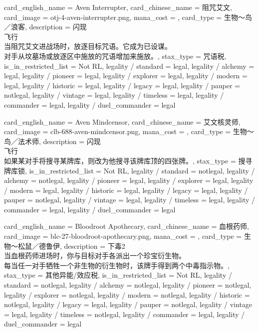 \documentclass[lang = cn, color = black, 10pt]{AllThatStax}
\begin{document}
\card
{
	card_english_name = {Aven Interrupter},
	card_chinese_name = {阻咒艾文},
	card_image = otj-4-aven-interrupter.png,
	mana_cost = ,
	card_type = 生物～鸟／浪客,
	description = {闪现\\
飞行\\
当阻咒艾文进战场时，放逐目标咒语。它成为已设谋。\\
对手从坟墓场或放逐区中施放的咒语增加来施放。},
	stax_type = 咒语税,
	is_in_restricted_list = Not RL,
	legality / standard = legal,
	legality / alchemy = legal,
	legality / pioneer = legal,
	legality / explorer = legal,
	legality / modern = legal,
	legality / historic = legal,
	legality / legacy = legal,
	legality / pauper = notlegal,
	legality / vintage = legal,
	legality / timeless = legal,
	legality / commander = legal,
	legality / duel_commander = legal
}

\card
{
	card_english_name = {Aven Mindcensor},
	card_chinese_name = {艾文核灵师},
	card_image = clb-688-aven-mindcensor.png,
	mana_cost = ,
	card_type = 生物～鸟／法术师,
	description = {闪现\\
飞行\\
如果某对手将搜寻某牌库，则改为他搜寻该牌库顶的四张牌。},
	stax_type = 搜寻牌库锁,
	is_in_restricted_list = Not RL,
	legality / standard = notlegal,
	legality / alchemy = notlegal,
	legality / pioneer = legal,
	legality / explorer = legal,
	legality / modern = legal,
	legality / historic = legal,
	legality / legacy = legal,
	legality / pauper = notlegal,
	legality / vintage = legal,
	legality / timeless = legal,
	legality / commander = legal,
	legality / duel_commander = legal
}

\card
{
	card_english_name = {Bloodroot Apothecary},
	card_chinese_name = {血根药师},
	card_image = blc-27-bloodroot-apothecary.png,
	mana_cost = ,
	card_type = 生物～松鼠／德鲁伊,
	description = {下毒2\\
当血根药师进场时，你与目标对手各派出一个珍宝衍生物。\\
每当任一对手牺牲一个非生物的衍生物时，该牌手得到两个中毒指示物。},
	stax_type = 其他异能/效应税,
	is_in_restricted_list = Not RL,
	legality / standard = notlegal,
	legality / alchemy = notlegal,
	legality / pioneer = notlegal,
	legality / explorer = notlegal,
	legality / modern = notlegal,
	legality / historic = notlegal,
	legality / legacy = legal,
	legality / pauper = notlegal,
	legality / vintage = legal,
	legality / timeless = notlegal,
	legality / commander = legal,
	legality / duel_commander = legal
}
\end{document}
